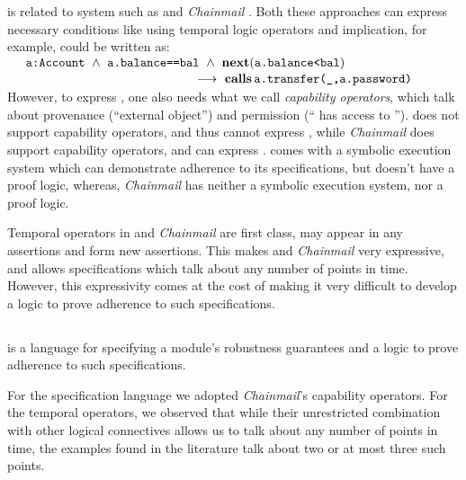 \Nec is related 
 to system such as {} \cite{VerX} and  \emph{Chainmail} \cite{FASE}.
Both these approaches can express necessary conditions
  like \SrobustA using
  temporal logic operators and implication, for example,  \SrobustA
 could be written as:
\\
 $\strut ~  ~ \hspace{.1in} \strut  \prg{a:Account} \ \wedge\ \prg{a.balance==bal}  \ \wedge\ \textbf{next}(\prg{a.balance<bal}) $\\
 $\strut ~ \hspace{2in} \strut \strut \strut \longrightarrow\    \textbf{calls}\, {\texttt{a.transfer(\_,a.password)}}$
 \\
 { However, to express \SrobustB, one also needs what we call \emph{capability operators}, which talk about 
 provenance (``external object'') and
  permission (`` has access to ''). 
   {}  does not support capability operators, and thus cannot express   \SrobustB, 
   while  \emph{Chainmail} does support capability operators, and can express  \SrobustB. 
}  
 {} comes with a symbolic 
  execution system which can demonstrate adherence to its specifications, but doesn't have a proof logic, %
   whereas, \emph{Chainmail}   {has neither a symbolic execution system, nor a proof logic.}
  
 {Temporal operators in {}   and  \emph{Chainmail}  are first class, \ie may appear in any assertions 
and form new assertions. This makes {}   and  \emph{Chainmail} very expressive,
and allows specifications which talk about any number of points in time.
However, this expressivity comes at the cost of making it very difficult to develop a logic to
prove adherence to such specifications.}
  
\vspace{.04in}

\subsection{\Nec}
\label{intro:this:work}
\Nec is a language for specifying a module's robustness guarantees 
and a logic 
to prove adherence to such specifications.

For the specification language we adopted  
\emph{Chainmail}'s    capability operators.
{For the 
  temporal operators, we observed that while their
   unrestricted combination with  other logical connectives allows us to talk about any
   number of points in time, the examples found in the literature talk about two or at most three such points. }

